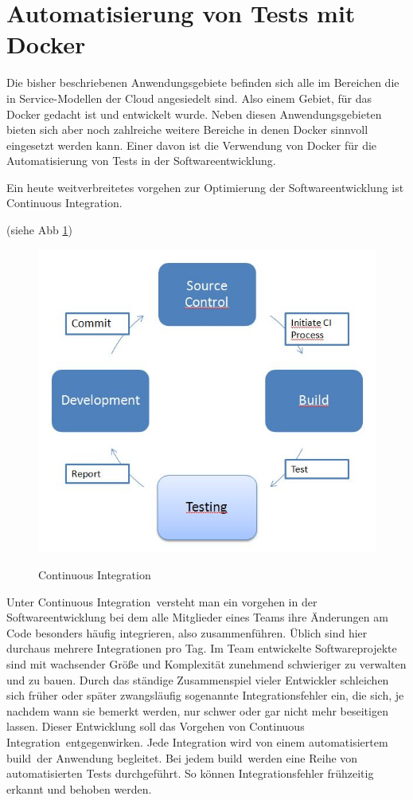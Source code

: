 \section{Automatisierung von Tests mit Docker}
\label{sec:automatisierung_von_tests_mit_docker}

Die bisher beschriebenen Anwendungsgebiete befinden sich alle im Bereichen die in Service-Modellen der Cloud angesiedelt sind. Also einem Gebiet, für das Docker gedacht ist und entwickelt wurde. Neben diesen Anwendungsgebieten bieten sich aber noch zahlreiche weitere Bereiche in denen Docker sinnvoll eingesetzt werden kann.
Einer davon ist die Verwendung von Docker für die Automatisierung von Tests in der Softwareentwicklung.

Ein heute weitverbreitetes vorgehen zur Optimierung der Softwareentwicklung ist \grq Continuous Integration\grq . 

(siehe Abb \ref{fig:ci})
\begin{figure}[htbp]
  \centering  
  \includegraphics[scale=0.5]{img/ci.jpg}\\
  \caption{Continuous Integration}
  \label{fig:ci}
\end{figure}

Unter \grq Continuous Integration\grq\ versteht man ein vorgehen in der Softwareentwicklung bei dem alle Mitglieder eines Teams ihre Änderungen am Code besonders häufig integrieren, also zusammenführen. Üblich sind hier durchaus mehrere Integrationen pro Tag. 
\glqq Im Team entwickelte Softwareprojekte sind mit wachsender Größe und Komplexität zunehmend schwieriger zu verwalten und zu bauen. Durch das ständige Zusammenspiel vieler Entwickler schleichen sich früher oder später zwangsläufig sogenannte Integrationsfehler ein, die sich, je nachdem wann sie bemerkt werden, nur schwer oder gar nicht mehr beseitigen lassen.\grqq \cite{feustel_continuous_2014}
Dieser Entwicklung soll das Vorgehen von \grq Continuous Integration\grq\ entgegenwirken.
Jede Integration wird von einem automatisiertem \grq build\grq\ der Anwendung begleitet. Bei jedem \grq build\grq\ werden eine Reihe von automatisierten Tests durchgeführt. So können Integrationsfehler frühzeitig erkannt und behoben werden.

